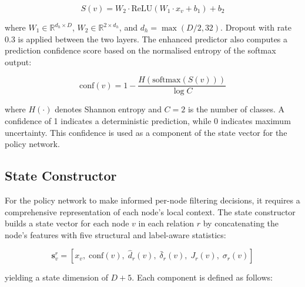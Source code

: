 \begin{equation}
S(v) = W_2 \cdot \text{ReLU}(W_1 \cdot x_v + b_1) + b_2
\end{equation}

\noindent
where \( W_1 \in \mathbb{R}^{d_h \times D} \), \( W_2 \in \mathbb{R}^{2 \times d_h} \), and \( d_h = \max(D/2, 32) \). Dropout with rate 0.3 is applied between the two layers. The enhanced predictor also computes a prediction confidence score based on the normalised entropy of the softmax output:

\begin{equation}
\text{conf}(v) = 1 - \frac{H(\text{softmax}(S(v)))}{\log C}
\end{equation}

\noindent
where \( H(\cdot) \) denotes Shannon entropy and \( C = 2 \) is the number of classes. A confidence of 1 indicates a deterministic prediction, while 0 indicates maximum uncertainty. This confidence is used as a component of the state vector for the policy network.

\subsection{State Constructor}
\label{sec:state-constructor}

For the policy network to make informed per-node filtering decisions, it requires a comprehensive representation of each node's local context. The state constructor builds a state vector for each node \( v \) in each relation \( r \) by concatenating the node's features with five structural and label-aware statistics:

\begin{equation}
\mathbf{s}_v^r = \left[ x_v, \; \text{conf}(v), \; \hat{d}_r(v), \; \bar{\delta}_r(v), \; J_r(v), \; \sigma_r(v) \right]
\end{equation}

\noindent
yielding a state dimension of \( D + 5 \). Each component is defined as follows:

